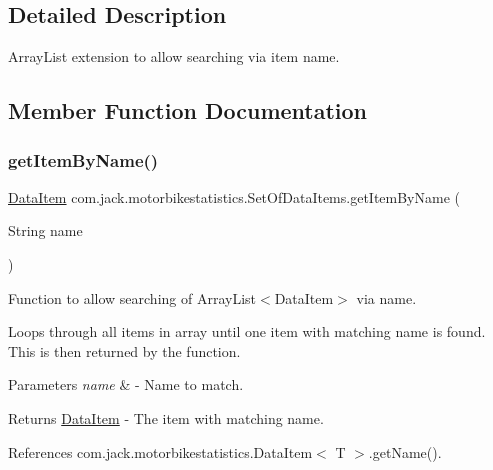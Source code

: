 \subsection{Detailed Description}
Array\+List extension to allow searching via item name. 

\subsection{Member Function Documentation}
\mbox{\label{classcom_1_1jack_1_1motorbikestatistics_1_1_set_of_data_items_a028fb1f4ce3fd7991d73d368720c19d9}} 
\subsubsection{\texorpdfstring{get\+Item\+By\+Name()}{getItemByName()}}
{\footnotesize\ttfamily \hyperlink{classcom_1_1jack_1_1motorbikestatistics_1_1_data_item}{Data\+Item} com.\+jack.\+motorbikestatistics.\+Set\+Of\+Data\+Items.\+get\+Item\+By\+Name (\begin{DoxyParamCaption}\item[{String}]{name }\end{DoxyParamCaption})\hspace{0.3cm}{\ttfamily [inline]}}



Function to allow searching of Array\+List$<$\+Data\+Item$>$ via name. 

Loops through all items in array until one item with matching name is found. This is then returned by the function.


\begin{DoxyParams}{Parameters}
{\em name} & -\/ Name to match. \\
\hline
\end{DoxyParams}
\begin{DoxyReturn}{Returns}
\hyperlink{classcom_1_1jack_1_1motorbikestatistics_1_1_data_item}{Data\+Item} -\/ The item with matching name. 
\end{DoxyReturn}


References com.\+jack.\+motorbikestatistics.\+Data\+Item$<$ T $>$.\+get\+Name().


